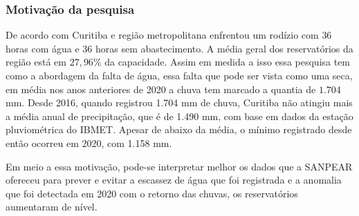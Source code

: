       
\subsubsection{Motiva\c c\~ao da pesquisa} \label{subsubsec:motivacao}
    
    De acordo com \cite{vasconcelos_2020} Curitiba e região metropolitana enfrentou um rodízio com $36$ horas com água e $36$ horas sem abastecimento. A média geral dos reservatórios da região está em $27,96\%$ da capacidade. Assim em medida a isso essa pesquisa tem como a abordagem da falta de água, essa falta que pode ser vista como uma seca, em média nos anos anteriores de 2020 a chuva tem marcado a quantia de $1.704$ mm. \cite{vasconcelos_2020} Desde 2016, quando registrou 1.704 mm de chuva, Curitiba não atingiu mais a média anual de precipitação, que é de 1.490 mm, com base em dados da estação pluviométrica do IBMET.  Apesar de abaixo da média, o mínimo registrado desde então ocorreu em 2020, com 1.158 mm.
    
    Em meio a essa motivação, pode-se interpretar melhor os dados que a SANPEAR ofereceu para prever e evitar a escassez de água que foi registrada e a anomalia que foi detectada em 2020 com o retorno das chuvas, os reservatórios aumentaram de nível.
    
    